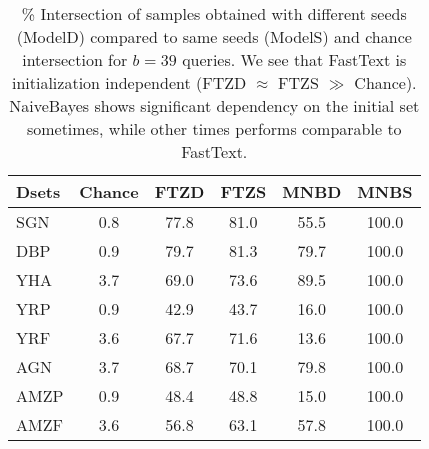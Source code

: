 \documentclass[11pt,a4paper]{article}
\begin{document}
\begin{table}[t]
\small\addtolength{\tabcolsep}{-4pt}
\centering
\begin{tabular}{|l|c||c|c||c|c|}
\hline
Dsets & Chance & FTZD & FTZS & MNBD & MNBS\\ \hline
SGN & 0.8 &  77.8 & 81.0 & 55.5 & 100.0 \\ \hline 
DBP & 0.9 &  79.7 & 81.3  & 79.7 & 100.0 \\ \hline
YHA & 3.7 & 69.0 & 73.6  & 89.5 & 100.0 \\ \hline 
YRP & 0.9 &  42.9 & 43.7  & 16.0 & 100.0 \\ \hline 
YRF & 3.6 &  67.7 & 71.6  & 13.6 & 100.0 \\ \hline 
AGN & 3.7 &  68.7 & 70.1  & 79.8 & 100.0 \\ \hline 
AMZP & 0.9 &  48.4 & 48.8  & 15.0 & 100.0 \\ \hline 
AMZF & 3.6 &  56.8 & 63.1  & 57.8 & 100.0 \\ \hline
\end{tabular}
\caption{\% Intersection of samples obtained with different seeds (ModelD) compared to same seeds (ModelS) and chance intersection for $b=39$ queries. We see that FastText is initialization independent (FTZD $\approx$ FTZS  $\gg$ Chance). NaiveBayes shows significant dependency on the initial set sometimes, while other times performs comparable to FastText.} 
\label{tab:seed_bias}
\end{table}
\end{document}
